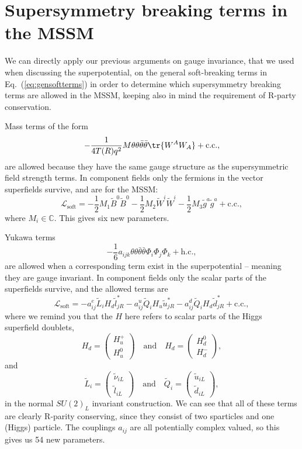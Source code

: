\documentclass[notes.tex]{subfiles}
\begin{document}
\section{Supersymmetry breaking terms in the MSSM}
\label{sec:MSSM_soft_terms}
We can directly apply our previous arguments on gauge invariance, that we used when discussing the superpotential, on the general soft-breaking terms in Eq.~(\ref{eq:gensoftterms}) in order to determine which supersymmetry breaking terms are allowed in the MSSM, keeping also in mind the requirement of R-party conservation.

Mass terms of the form
\[ -\frac{1}{4T(R)q^2} M\theta\theta\bar{\theta}\bar{\theta}\tr{W^AW_A}+\text{c.c.}, \]
are allowed because they have the same gauge structure as the supersymmetric field strength terms. In component fields only the fermions in the vector superfields survive, and are for the MSSM:
\[\mathcal L_\text{soft} =  -\frac{1}{2}M_1\tilde{B}^0\tilde{B}^0 - \frac{1}{2}M_2\tilde{W}^i \tilde{W}^i- \frac{1}{2}M_3 \tilde{g}^{a}\tilde{g}^a + \text{c.c.},\]
where $M_i\in\mathbb C$. This gives six new parameters. 

Yukawa terms
\[-\frac{1}{6} a_{ijk}\theta\theta\bar{\theta}\bar{\theta} \Phi_i\Phi_j\Phi_k+\text{h.c.},\]
are allowed when a corresponding term exist in the superpotential  -- meaning they are gauge invariant. In component fields only the scalar parts of the superfields survive, and the allowed terms are
\[ \mathcal L_\text{soft} =  -a^e_{ij}\tilde{L}_iH_d\tilde{l}^*_{jR} - a_{ij}^u \tilde{Q}_i H_u \tilde{u}^*_{jR} - a_{ij}^d \tilde{Q}_i H_d \tilde{d}^*_{jR} + \text{c.c.},\]
where we remind you that the $H$ here refers to scalar parts of the Higgs superfield doublets,
\[ H_d=\left( \begin{matrix} H_u^+ \\ H_u^0 \end{matrix}\right) \quad  \text{and} \quad H_d=\left(\begin{matrix} H_d^0 \\ H_d^- \end{matrix}\right),\]
and
\[ \tilde L_i =\left(\begin{matrix} \tilde\nu_{iL} \\ \tilde l_{iL} \end{matrix}\right) \quad\text{and}\quad \tilde Q_i =\left(\begin{matrix} \tilde u_{iL} \\ \tilde d_{iL}\end{matrix}\right),\] 
in the normal $SU(2)_L$ invariant construction.
We can see that all of these terms are clearly R-parity conserving, since they consist of two sparticles and one (Higgs) particle.
The couplings $a_{ij}$ are all potentially complex valued, so this gives us 54 new parameters. 
\end{document}
